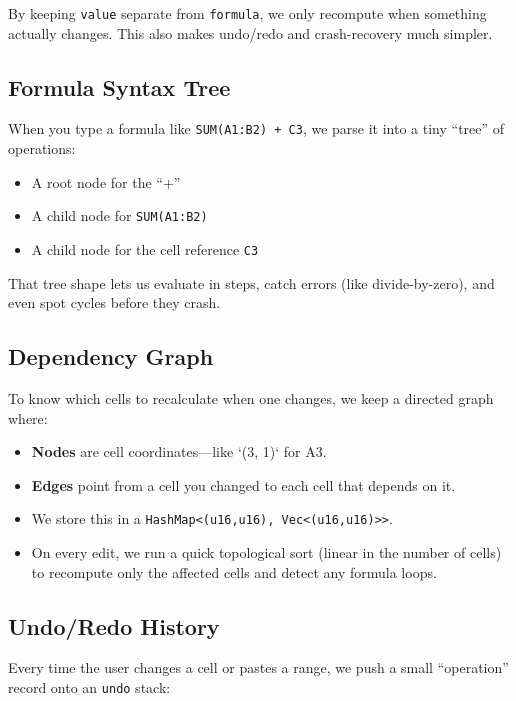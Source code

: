 \documentclass[12pt]{article}
\begin{document}
    By keeping \texttt{value} separate from \texttt{formula}, we only recompute when something actually changes.  This also makes undo/redo and crash-recovery much simpler.

    \subsection{Formula Syntax Tree}

    When you type a formula like \texttt{SUM(A1:B2) + C3}, we parse it into a tiny “tree” of operations:

    \begin{itemize}
        \item A root node for the ``+''
        \item A child node for \texttt{SUM(A1:B2)}
        \item A child node for the cell reference \texttt{C3}
    \end{itemize}

    That tree shape lets us evaluate in steps, catch errors (like divide-by-zero), and even spot cycles before they crash.

    \subsection{Dependency Graph}

    To know which cells to recalculate when one changes, we keep a directed graph where:

    \begin{itemize}
        \item \textbf{Nodes} are cell coordinates—like `(3, 1)` for A3.
        \item \textbf{Edges} point from a cell you changed to each cell that depends on it.
        \item We store this in a \texttt{HashMap<(u16,u16), Vec<(u16,u16)>>}.
        \item On every edit, we run a quick topological sort (linear in the number of cells\!) to recompute only the affected cells and detect any formula loops.
    \end{itemize}

    \subsection{Undo/Redo History}

    Every time the user changes a cell or pastes a range, we push a small “operation” record onto an \texttt{undo} stack:
\end{document}

